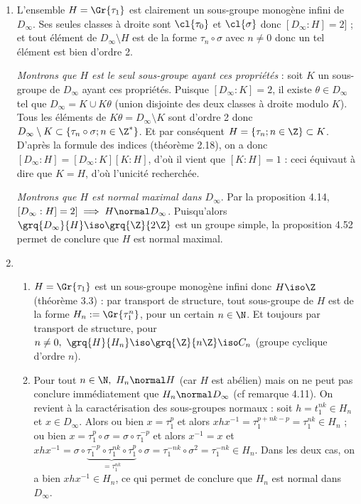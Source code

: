\begin{enumerate}[1)]
\item L'ensemble $H=\Gr{\tau_1}$ est clairement un sous-groupe monogène infini de $D_{\infty}$. Ses seules classes à droite sont $\cl{\tau_0}$ et $\cl{\sigma}$ donc $[D_{\infty}:H] = 2]$ ; et tout élément
de $D_{\infty}\setminus H$ est de la forme $\tau_n\circ \sigma$ avec $n \neq 0$ donc un tel élément est bien d'ordre 2.

\emph{Montrons que $H$ est le seul sous-groupe ayant ces propriétés} : soit $K$ un sous-groupe de $D_{\infty}$ ayant ces propriétés. Puisque $[D_{\infty}:K] = 2$, il existe $\theta \in D_{\infty}$ tel que 
$D_{\infty} = K \cup K \theta$ (union disjointe des deux classes à droite modulo $K$). Tous les éléments de $K \theta = D_{\infty}\setminus K$ sont d'ordre 2 donc $D_{\infty}\setminus K \subset \left\{ \tau_n\circ \sigma;n\in \Z^*\right\}$. 
Et par conséquent $H =  \left\{ \tau_n ;n\in \Z\right\} \subset K$. D'après la formule des indices (théorème 2.18), on a donc $[D_{\infty}:H] = [D_{\infty}:K][K:H]$, d'où il vient que $[K:H] = 1$ : ceci équivaut à dire que $K=H$, 
d'où l'unicité recherchée.\medskip

\emph{Montrons que $H$ est normal maximal dans $D_{\infty}$}. Par la proposition 4.14, $[D_{\infty}:H] = 2]\implies H\normal D_{\infty}$. Puisqu'alors $\grq{D_{\infty}}{H}\iso \grq{\Z}{2\Z}$ est 
un groupe simple, la proposition 4.52 permet de conclure que $H$ est normal maximal.

\item \begin{enumerate}
    \item $H=\Gr{\tau_1}$ est un sous-groupe monogène infini donc $H\iso \Z$ (théorème 3.3) : par transport de structure, tout sous-groupe de $H$ est de la forme $H_n := \Gr{\tau_1^n}$, pour un certain $n\in \N$. 
    Et toujours par transport de structure, pour $n\neq 0,~ \grq{H}{H_n} \iso \grq{\Z}{n\Z} \iso C_n$ (groupe cyclique d'ordre $n$).
    \item Pour tout $n\in \N,~ H_n \normal H$ (car $H$ est abélien) mais on ne peut pas conclure immédiatement que $H_n\normal D_{\infty}$ (cf remarque 4.11). On revient à la caractérisation des sous-groupes normaux : 
    soit $h=t_1^{nk}\in H_n$ et $x\in D_{\infty}$. Alors ou bien $x = \tau_1^p$ et alors $xhx^{-1} = \tau_1^{p+nk-p} = \tau_1^{nk}\in H_n$ ; ou bien $x=\tau_1^p \circ \sigma = \sigma\circ \tau_1^{-p}$ et alors $x^{-1} = x$ et 
    $xhx^{-1} = \sigma\circ \underbrace{\tau_1^{-p} \circ \tau_1^{nk} \circ \tau_1^p}_{= \tau_1^{nk}} \circ \sigma = \tau_1^{-nk}\circ \sigma^2 = \tau_1^{-nk} \in H_n$. Dans les deux cas, on a bien $xhx^{-1} \in H_n$, ce qui 
    permet de conclure que $H_n$ est normal dans $D_{\infty}$.\medskip


\end{enumerate}
\end{enumerate}
